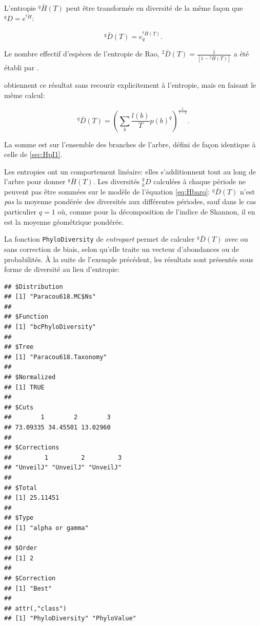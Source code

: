 \documentclass[
  11pt,
  french,
  a4paper,
  extrafontsizes,onecolumn,openright
  ]{memoir}
\newenvironment{Shaded}{\begin{snugshade}}{\end{snugshade}}
\newcommand{\DecValTok}[1]{\textcolor[rgb]{0.00,0.00,0.81}{#1}}
\newcommand{\KeywordTok}[1]{\textcolor[rgb]{0.13,0.29,0.53}{\textbf{#1}}}
\newcommand{\NormalTok}[1]{#1}
\newcommand{\OperatorTok}[1]{\textcolor[rgb]{0.81,0.36,0.00}{\textbf{#1}}}
\begin{document}
L'entropie \(^{q}\!\bar{H}(T)\) peut être transformée en diversité \autocite{Marcon2014a} de la même façon que \(^{q}\!D = e^{^{q}\!H}\):

\begin{equation}
  \label{eq:DbarqT}
  ^{q}\!\bar{D}\left(T\right)=e^{^{q}\!\bar{H}\left(T\right)}_q.
\end{equation}

Le nombre effectif d'espèces de l'entropie de Rao, \({^{2}\!\bar{D}}(T)=\frac{1}{[1-{^{2}\!\bar{H}}(T)]}\) a été établi par \textcite{Ricotta2009}.

\textcite{Chao2010} obtiennent ce résultat sans recourir explicitement à l'entropie, mais en faisant le même calcul:

\begin{equation}
  \label{eq:DbarqChao}
  {^{q}\!\bar{D}} \left( T \right)
  =\left( \sum_b{\frac{l(b)}{T} p(b)^q} \right)^{\frac{1}{1-q}}.
\end{equation}

La somme est sur l'ensemble des branches de l'arbre, défini de façon identique à celle de \textcite{Allen2009} \ref{sec:HpI1}.

Les entropies ont un comportement linéaire: elles s'additionnent tout au long de l'arbre pour donner \(^{q}\!\bar{H}(T)\).
Les diversités \(^{q}_{k}\!D\) calculées à chaque période ne peuvent pas être sommées sur le modèle de l'équation \eqref{eq:Hbarq}: \(^{q}\!\bar{D}(T)\) n'est \emph{pas} la moyenne pondérée des diversités aux différentes périodes, sauf dans le cas particulier \(q=1\) où, comme pour la décomposition de l'indice de Shannon, il en est la moyenne géométrique pondérée.

La fonction \texttt{PhyloDiversity} de \emph{entropart} permet de calculer \(^{q}\!\bar{D}(T)\) avec ou sans correction de biais, selon qu'elle traite un vecteur d'abondances ou de probabilités.
À la suite de l'exemple précédent, les résultats sont présentés sous forme de diversité au lieu d'entropie:

\scriptsize

\begin{Shaded}
\end{Shaded}

\begin{verbatim}
## $Distribution
## [1] "Paracou618.MC$Ns"
## 
## $Function
## [1] "bcPhyloDiversity"
## 
## $Tree
## [1] "Paracou618.Taxonomy"
## 
## $Normalized
## [1] TRUE
## 
## $Cuts
##        1        2        3 
## 73.09335 34.45501 13.02960 
## 
## $Corrections
##         1         2         3 
## "UnveilJ" "UnveilJ" "UnveilJ" 
## 
## $Total
## [1] 25.11451
## 
## $Type
## [1] "alpha or gamma"
## 
## $Order
## [1] 2
## 
## $Correction
## [1] "Best"
## 
## attr(,"class")
## [1] "PhyloDiversity" "PhyloValue"
\end{verbatim}
\end{document}
